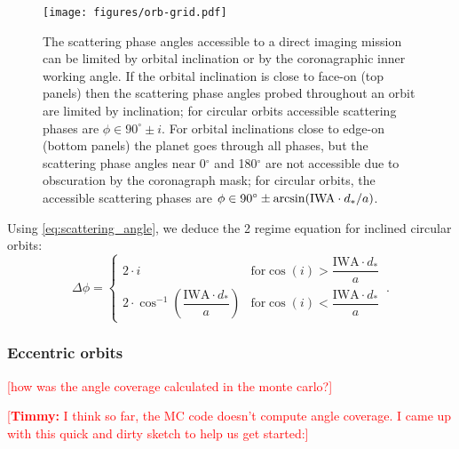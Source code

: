 \documentclass[
    usenatbib,
]{mnras}
\newcommand{\todo}[1]{\textcolor{red}{[#1]}}
\newcommand{\timmy}[1]{\textcolor{red}{[\textbf{Timmy:} #1]}} %
\begin{document}
\begin{figure}
   \centering
   \texttt{[image: figures/orb-grid.pdf]}
   \caption{
        The scattering phase angles accessible to a direct imaging mission can be limited by orbital inclination or by the coronagraphic inner working angle. 
        If the orbital inclination is close to face-on (top panels) then the scattering phase angles probed throughout an orbit are limited by inclination; for circular orbits accessible scattering phases are $\phi \in 90^\circ \pm i$. 
        For orbital inclinations close to edge-on (bottom panels) the planet goes through all phases, but the scattering phase angles near 0$^\circ$ and 180$^\circ$ are not accessible due to obscuration by the coronagraph mask; for circular orbits, the accessible scattering phases are $\phi \in 90^\circ \pm \arcsin({\rm IWA}\cdot d_*/a)$.
    }
    \label{fig:orb-grid}
\end{figure}

Using \cref{eq:scattering_angle}, we deduce the 2 regime equation for inclined circular orbits: 
\begin{equation}
\label{eq:Delta_phi_max}
    \Delta \phi = 
    \begin{cases}
        2 \cdot i & \textrm{for} \cos(i) > \dfrac{\mathrm{IWA}\cdot d_* }{a}
  \\ 
        2 \cdot \cos^{-1}\left(\dfrac{\mathrm{IWA}\cdot d_* }{a}\right)  & \textrm{for} \cos(i) < \dfrac{\mathrm{IWA}\cdot d_* }{a}
    \end{cases}\,.
\end{equation}


\subsubsection{Eccentric orbits}

\todo{how was the angle coverage calculated in the monte carlo?}

\timmy{I think so far, the MC code doesn't compute angle coverage. I came up with this quick and dirty sketch to help us get started:}


\end{document}
